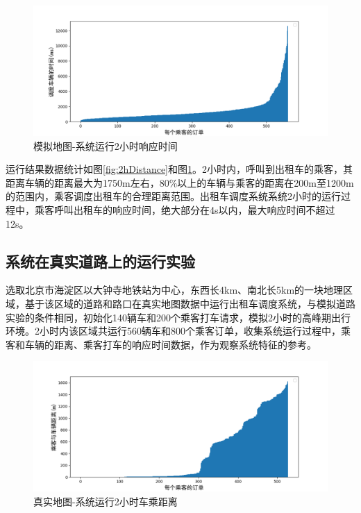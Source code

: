 \begin{figure}[h]
  \centering
  \includegraphics[width=1.0\textwidth]{figures/2hTime}
  \caption{模拟地图-系统运行2小时响应时间}\label{fig:2hTime}
\end{figure}

运行结果数据统计如图\ref{fig:2hDistance}和图\ref{fig:2hTime}。2小时内，呼叫到出租车的乘客，其距离车辆的距离最大为1750m左右，80$\%$以上的车辆与乘客的距离在200m至1200m的范围内，乘客调度出租车的合理距离范围。出租车调度系统系统2小时的运行过程中，乘客呼叫出租车的响应时间，绝大部分在4s以内，最大响应时间不超过12s。

\subsection{系统在真实道路上的运行实验}
选取北京市海淀区以大钟寺地铁站为中心，东西长4km、南北长5km的一块地理区域，基于该区域的道路和路口在真实地图数据中运行出租车调度系统，与模拟道路实验的条件相同，初始化140辆车和200个乘客打车请求，模拟2小时的高峰期出行环境。2小时内该区域共运行560辆车和800个乘客订单，收集系统运行过程中，乘客和车辆的距离、乘客打车的响应时间数据，作为观察系统特征的参考。

\begin{figure}[h]
  \centering
  \includegraphics[width=1.0\textwidth]{figures/real_2hDistance}
  \caption{真实地图-系统运行2小时车乘距离}\label{fig:real_2hDistance}
\end{figure}

